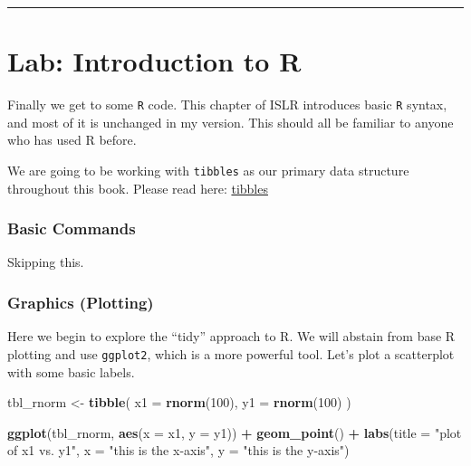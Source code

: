 \documentclass[]{book}
\newenvironment{Shaded}{\begin{snugshade}}{\end{snugshade}}
\newcommand{\DataTypeTok}[1]{\textcolor[rgb]{0.13,0.29,0.53}{#1}}
\newcommand{\DecValTok}[1]{\textcolor[rgb]{0.00,0.00,0.81}{#1}}
\newcommand{\KeywordTok}[1]{\textcolor[rgb]{0.13,0.29,0.53}{\textbf{#1}}}
\newcommand{\NormalTok}[1]{#1}
\newcommand{\OperatorTok}[1]{\textcolor[rgb]{0.81,0.36,0.00}{\textbf{#1}}}
\newcommand{\StringTok}[1]{\textcolor[rgb]{0.31,0.60,0.02}{#1}}
\begin{document}
\begin{center}\rule{0.5\linewidth}{\linethickness}\end{center}

\hypertarget{lab-introduction-to-r}{%
\section{Lab: Introduction to R}\label{lab-introduction-to-r}}

Finally we get to some \texttt{R} code. This chapter of ISLR introduces basic \texttt{R} syntax, and most of it is unchanged in my version. This should all be familiar to anyone who has used R before.

We are going to be working with \texttt{tibbles} as our primary data structure throughout this book. Please read here: \href{http://r4ds.had.co.nz/tibbles.html}{tibbles}

\hypertarget{basic-commands}{%
\subsubsection{Basic Commands}\label{basic-commands}}

Skipping this.

\hypertarget{graphics-plotting}{%
\subsubsection{Graphics (Plotting)}\label{graphics-plotting}}

Here we begin to explore the ``tidy'' approach to R. We will abstain from base R plotting and use \texttt{ggplot2}, which is a more powerful tool. Let's plot a scatterplot with some basic labels.

\begin{Shaded}
\begin{Highlighting}[]
\NormalTok{tbl_rnorm <-}\StringTok{ }\KeywordTok{tibble}\NormalTok{(}
  \DataTypeTok{x1 =} \KeywordTok{rnorm}\NormalTok{(}\DecValTok{100}\NormalTok{),}
  \DataTypeTok{y1 =} \KeywordTok{rnorm}\NormalTok{(}\DecValTok{100}\NormalTok{)}
\NormalTok{)}

\KeywordTok{ggplot}\NormalTok{(tbl_rnorm, }\KeywordTok{aes}\NormalTok{(}\DataTypeTok{x =}\NormalTok{ x1, }\DataTypeTok{y =}\NormalTok{ y1)) }\OperatorTok{+}\StringTok{ }
\StringTok{  }\KeywordTok{geom_point}\NormalTok{() }\OperatorTok{+}\StringTok{ }
\StringTok{  }\KeywordTok{labs}\NormalTok{(}\DataTypeTok{title =} \StringTok{"plot of x1 vs. y1"}\NormalTok{,}
       \DataTypeTok{x =} \StringTok{"this is the x-axis"}\NormalTok{,}
       \DataTypeTok{y =} \StringTok{"this is the y-axis"}\NormalTok{)}
\end{Highlighting}
\end{Shaded}
\end{document}
